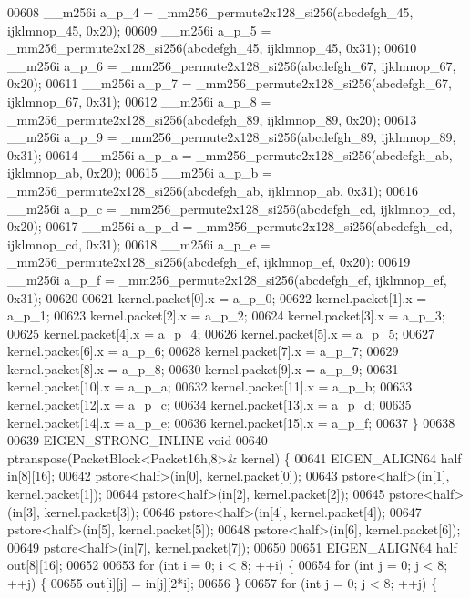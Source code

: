 \begin{DoxyCode}
00608   \_\_m256i a\_p\_4 = \_mm256\_permute2x128\_si256(abcdefgh\_45, ijklmnop\_45, 0x20);
00609   \_\_m256i a\_p\_5 = \_mm256\_permute2x128\_si256(abcdefgh\_45, ijklmnop\_45, 0x31);
00610   \_\_m256i a\_p\_6 = \_mm256\_permute2x128\_si256(abcdefgh\_67, ijklmnop\_67, 0x20);
00611   \_\_m256i a\_p\_7 = \_mm256\_permute2x128\_si256(abcdefgh\_67, ijklmnop\_67, 0x31);
00612   \_\_m256i a\_p\_8 = \_mm256\_permute2x128\_si256(abcdefgh\_89, ijklmnop\_89, 0x20);
00613   \_\_m256i a\_p\_9 = \_mm256\_permute2x128\_si256(abcdefgh\_89, ijklmnop\_89, 0x31);
00614   \_\_m256i a\_p\_a = \_mm256\_permute2x128\_si256(abcdefgh\_ab, ijklmnop\_ab, 0x20);
00615   \_\_m256i a\_p\_b = \_mm256\_permute2x128\_si256(abcdefgh\_ab, ijklmnop\_ab, 0x31);
00616   \_\_m256i a\_p\_c = \_mm256\_permute2x128\_si256(abcdefgh\_cd, ijklmnop\_cd, 0x20);
00617   \_\_m256i a\_p\_d = \_mm256\_permute2x128\_si256(abcdefgh\_cd, ijklmnop\_cd, 0x31);
00618   \_\_m256i a\_p\_e = \_mm256\_permute2x128\_si256(abcdefgh\_ef, ijklmnop\_ef, 0x20);
00619   \_\_m256i a\_p\_f = \_mm256\_permute2x128\_si256(abcdefgh\_ef, ijklmnop\_ef, 0x31);
00620 
00621   kernel.packet[0].x = a\_p\_0;
00622   kernel.packet[1].x = a\_p\_1;
00623   kernel.packet[2].x = a\_p\_2;
00624   kernel.packet[3].x = a\_p\_3;
00625   kernel.packet[4].x = a\_p\_4;
00626   kernel.packet[5].x = a\_p\_5;
00627   kernel.packet[6].x = a\_p\_6;
00628   kernel.packet[7].x = a\_p\_7;
00629   kernel.packet[8].x = a\_p\_8;
00630   kernel.packet[9].x = a\_p\_9;
00631   kernel.packet[10].x = a\_p\_a;
00632   kernel.packet[11].x = a\_p\_b;
00633   kernel.packet[12].x = a\_p\_c;
00634   kernel.packet[13].x = a\_p\_d;
00635   kernel.packet[14].x = a\_p\_e;
00636   kernel.packet[15].x = a\_p\_f;
00637 \}
00638 
00639 EIGEN\_STRONG\_INLINE \textcolor{keywordtype}{void}
00640 ptranspose(PacketBlock<Packet16h,8>& kernel) \{
00641   EIGEN\_ALIGN64 half in[8][16];
00642   pstore<half>(in[0], kernel.packet[0]);
00643   pstore<half>(in[1], kernel.packet[1]);
00644   pstore<half>(in[2], kernel.packet[2]);
00645   pstore<half>(in[3], kernel.packet[3]);
00646   pstore<half>(in[4], kernel.packet[4]);
00647   pstore<half>(in[5], kernel.packet[5]);
00648   pstore<half>(in[6], kernel.packet[6]);
00649   pstore<half>(in[7], kernel.packet[7]);
00650 
00651   EIGEN\_ALIGN64 half out[8][16];
00652 
00653   \textcolor{keywordflow}{for} (\textcolor{keywordtype}{int} i = 0; i < 8; ++i) \{
00654     \textcolor{keywordflow}{for} (\textcolor{keywordtype}{int} j = 0; j < 8; ++j) \{
00655       out[i][j] = in[j][2*i];
00656     \}
00657     \textcolor{keywordflow}{for} (\textcolor{keywordtype}{int} j = 0; j < 8; ++j) \{

\end{DoxyCode}
